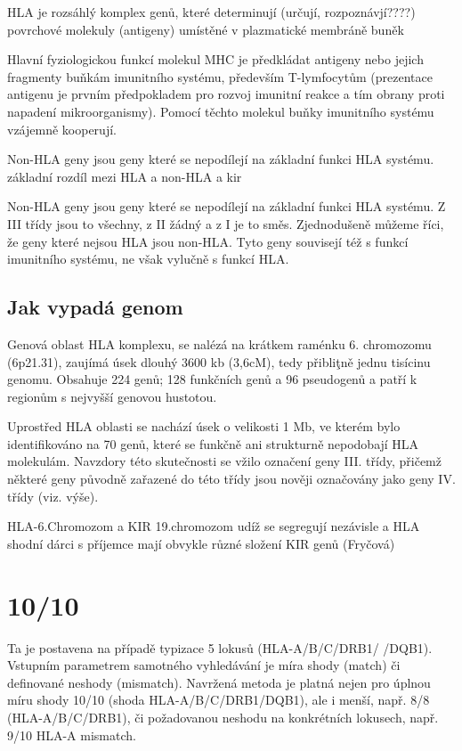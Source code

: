 \documentclass[czech,DP]{thesiskiv}
\begin{document}
HLA je rozsáhlý komplex genů, které determinují (určují, rozpoznávjí????) povrchové molekuly (antigeny) umístěné v plazmatické membráně buněk

Hlavní fyziologickou funkcí molekul MHC je předkládat antigeny nebo jejich fragmenty buňkám imunitního systému, především T-lymfocytům (prezentace antigenu je prvním předpokladem pro rozvoj imunitní reakce a tím obrany proti napadení mikroorganismy). Pomocí těchto molekul buňky imunitního systému vzájemně kooperují.

Non-HLA geny jsou geny které se nepodílejí na základní funkci HLA systému.
\\základní rozdíl mezi HLA a non-HLA a kir

Non-HLA geny jsou geny které se nepodílejí na základní funkci HLA systému. Z III třídy jsou to všechny, z II žádný a z I je to směs. Zjednodušeně můžeme říci, že geny které nejsou HLA jsou non-HLA. Tyto geny souvisejí též s funkcí imunitního systému, ne však vylučně s funkcí HLA. 



\subsection{Jak vypadá genom} 
Genová oblast HLA komplexu, se nalézá na krátkem raménku 6. chromozomu (6p21.31), zaujímá úsek dlouhý 3600 kb
(3,6cM), tedy přibliţně jednu tisícinu genomu. Obsahuje 224 genů; 128 funkčních genů
a 96 pseudogenů a patří k regionům s nejvyšší genovou hustotou.

Uprostřed HLA oblasti se nachází úsek o velikosti 1 Mb, ve kterém bylo identifikováno na
70 genů, které se funkčně ani strukturně nepodobají HLA molekulám. Navzdory této
skutečnosti se vžilo označení geny III. třídy, přičemž některé geny původně zařazené do
této třídy jsou nověji označovány jako geny IV. třídy (viz. výše).

HLA-6.Chromozom a KIR 19.chromozom
udíž se segregují nezávisle a
HLA shodní dárci s příjemce mají obvykle různé složení KIR genů (Fryčová)


\section{10/10}
Ta je postavena na případě typizace 5 lokusů (HLA-A/B/C/DRB1/ /DQB1). Vstupním parametrem samotného vyhledávání je míra shody (match) či definované neshody (mismatch). Navržená metoda je platná nejen pro úplnou míru shody 10/10 (shoda HLA-A/B/C/DRB1/DQB1), ale i menší, např. 8/8 (HLA-A/B/C/DRB1), či požadovanou neshodu na konkrétních lokusech, např. 9/10 HLA-A mismatch. 
\end{document}

